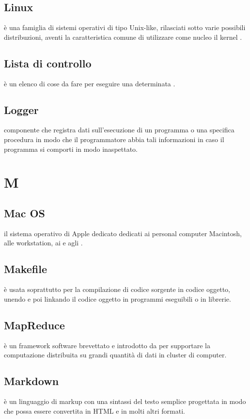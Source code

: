 \documentclass[12pt,a4paper]{article}
\begin{document}
\subsection{Linux} 
 è una famiglia di sistemi operativi  di tipo Unix-like, rilasciati sotto varie possibili distribuzioni, aventi la caratteristica comune di utilizzare come nucleo il kernel .

\subsection{Lista di controllo} 
 è un elenco di cose da fare per eseguire una determinata .

\subsection{Logger} 
componente che registra dati sull'esecuzione di un programma o una specifica procedura in modo che il programmatore abbia tali informazioni in caso il programma si comporti in modo inaspettato.


\newpage

\section{M}


\subsection{Mac OS} 
 il sistema operativo di Apple dedicato dedicati ai personal computer Macintosh, alle workstation, ai  e agli .

\subsection{Makefile} 
 è usata soprattutto per la compilazione di codice sorgente in codice oggetto, unendo e poi linkando il codice oggetto in programmi eseguibili o in librerie.

\subsection{MapReduce} 
 è un framework software brevettato e introdotto da  per supportare la computazione distribuita su grandi quantità di dati in cluster di computer.
 
\subsection{Markdown} 
è un linguaggio di markup con una sintassi del testo semplice progettata in modo che possa essere convertita in HTML e in molti altri formati.
\end{document}
